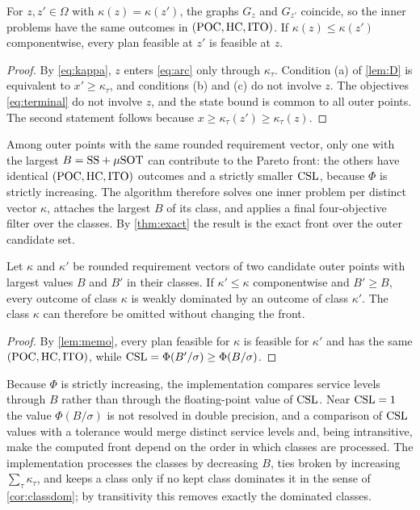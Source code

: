 \begin{lemma}\label{lem:memo}
  For $z,z'\in\Omega$ with $\kappa(z)=\kappa(z')$, the graphs $G_z$ and $G_{z'}$ coincide,
  so the inner problems have the same outcomes in $(\mathrm{POC},\mathrm{HC},\mathrm{ITO})$. If
  $\kappa(z)\le\kappa(z')$ componentwise, every plan feasible at $z'$ is feasible at $z$.
\end{lemma}

\begin{proof}
  By \eqref{eq:kappa}, $z$ enters \eqref{eq:arc} only through $\kappa_\tau$. Condition
  (a) of \cref{lem:D} is equivalent to $x'\ge\kappa_\tau$, and conditions (b) and (c) do
  not involve $z$. The objectives \eqref{eq:terminal} do not involve $z$, and the state
  bound is common to all outer points. The second statement follows because
  $x\ge\kappa_\tau(z')\ge\kappa_\tau(z)$.
\end{proof}

\begin{corollary}\label{cor:memo}
  Among outer points with the same rounded requirement vector, only one with the largest
  $B=\mathrm{SS}+\mu\mathrm{SOT}$ can contribute to the Pareto front: the others have identical
  $(\mathrm{POC},\mathrm{HC},\mathrm{ITO})$ outcomes and a strictly smaller $\mathrm{CSL}$, because $\Phi$ is strictly
  increasing. The algorithm therefore solves one inner problem per distinct vector
  $\kappa$, attaches the largest $B$ of its class, and applies a final four-objective
  filter over the classes. By \cref{thm:exact} the result is the exact front over the
  outer candidate set.
\end{corollary}

\begin{corollary}\label{cor:classdom}
  Let $\kappa$ and $\kappa'$ be rounded requirement vectors of two candidate outer points
  with largest values $B$ and $B'$ in their classes. If $\kappa'\le\kappa$ componentwise and
  $B'\ge B$, every outcome of class $\kappa$ is weakly dominated by an outcome of class
  $\kappa'$. The class $\kappa$ can therefore be omitted without changing the front.
\end{corollary}

\begin{proof}
  By \cref{lem:memo}, every plan feasible for $\kappa$ is feasible for $\kappa'$ and has the
  same $(\mathrm{POC},\mathrm{HC},\mathrm{ITO})$, while $\mathrm{CSL}=\Phi(B'/\sigma)\ge\Phi(B/\sigma)$.
\end{proof}

\noindent
Because $\Phi$ is strictly increasing, the implementation compares service levels through
$B$ rather than through the floating-point value of $\mathrm{CSL}$. Near $\mathrm{CSL}=1$ the value
$\Phi(B/\sigma)$ is not resolved in double precision, and a comparison of $\mathrm{CSL}$ values with a
tolerance would merge distinct service levels and, being intransitive, make the computed
front depend on the order in which classes are processed. The implementation processes the classes by decreasing $B$, ties broken by increasing
$\sum_\tau\kappa_\tau$, and keeps a class only if no kept class dominates it in the sense
of \cref{cor:classdom}; by transitivity this removes exactly the dominated classes.

